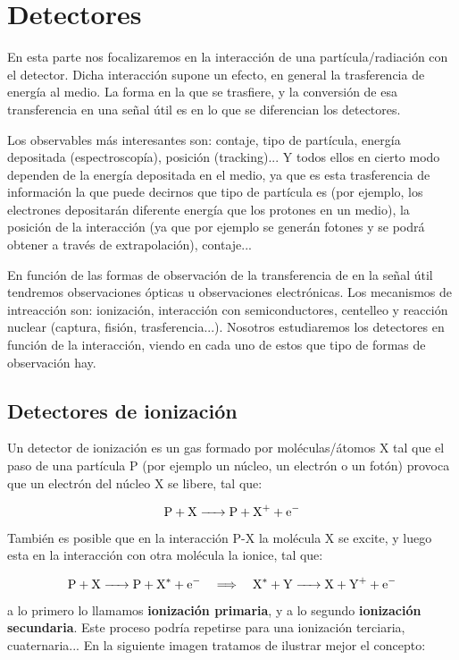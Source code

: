 \section{Detectores}

En esta parte nos focalizaremos en la interacción de una partícula/radiación con el detector. Dicha interacción supone un efecto, en general la trasferencia de energía al medio. La forma en la que se trasfiere, y la conversión de esa transferencia en una señal útil es en lo que se diferencian los detectores. 

Los observables más interesantes son: contaje, tipo de partícula, energía depositada (espectroscopía), posición (tracking)... Y todos ellos en cierto modo dependen de la energía depositada en el medio, ya que es esta trasferencia de información la que puede decirnos que tipo de partícula es (por ejemplo, los electrones depositarán diferente energía que los protones en un medio), la posición de la interacción (ya que por ejemplo se generán fotones y se podrá obtener a través de extrapolación), contaje... 

En función de las formas de observación de la transferencia de en la señal útil tendremos observaciones ópticas u observaciones electrónicas. Los mecanismos de intreacción son: ionización, interacción con semiconductores, centelleo y reacción nuclear (captura, fisión, trasferencia...). Nosotros estudiaremos los detectores en función de la interacción, viendo en cada uno de estos que tipo de formas de observación hay. 

\subsection{Detectores de ionización}

Un detector de ionización es un gas formado por moléculas/átomos X tal que el paso de una partícula P (por ejemplo un núcleo, un electrón o un fotón) provoca que un  electrón del núcleo X se libere, tal que: 

\[ \ce{P + X -> P +  X+ + e-} \]
También es posible que en la interacción P-X la molécula X se excite, y luego esta en la interacción con otra molécula la ionice, tal que: 

\[ \ce{P + X -> P +  X^* + e-} \quad \Longrightarrow \quad  \ce{X^* + Y -> X + Y^+ + e-}  \]
a lo primero lo llamamos \textbf{ionización primaria}, y a lo segundo \textbf{ionización secundaria}. Este proceso podría repetirse para una ionización terciaria, cuaternaria... En la siguiente imagen tratamos de ilustrar mejor el concepto: 

